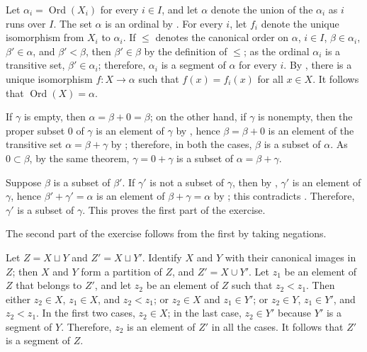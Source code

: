 \documentclass{article}
\begin{document}
\begin{solution}[\ref{exe:e0x1yv2c}]
  \label{sol:2a9apl7w}
  Let \(\alpha_i = \operatorname{Ord}(X_i)\) for every \(i \in I\),
  and let \(\alpha\) denote the union of the \(\alpha_i\) as \(i\)
  runs over \(I\).  The set \(\alpha\) is an ordinal by
  .  For every \(i\), let \(f_i\) denote the unique
  isomorphism from \(X_i\) to \(\alpha_i\).  If \(\leq\) denotes the
  canonical order on \(\alpha\), \(i \in I\), \(\beta \in \alpha_i\),
  \(\beta' \in \alpha\), and \(\beta' < \beta\), then
  \(\beta' \in \beta\) by the definition of \(\leq\); as the ordinal
  \(\alpha_i\) is a transitive set, \(\beta' \in \alpha_i\);
  therefore, \(\alpha_i\) is a segment of \(\alpha\) for every \(i\).
  By , there is a unique isomorphism
  \(f : X \to \alpha\) such that \(f(x) = f_i(x)\) for all
  \(x \in X\).  It follows that \(\operatorname{Ord}(X) = \alpha\).
\end{solution}

\begin{solution}[\ref{exe:v5ldoxkc}]
  \label{sol:2pzkfvo2}
  If \(\gamma\) is empty, then \(\alpha = \beta + 0 = \beta\); on the
  other hand, if \(\gamma\) is nonempty, then the proper subset \(0\)
  of \(\gamma\) is an element of \(\gamma\) by ,
  hence \(\beta = \beta + 0\) is an element of the transitive set
  \(\alpha = \beta + \gamma\) by ; therefore, in
  both the cases, \(\beta\) is a subset of \(\alpha\).  As
  \(0 \subset \beta\), by the same theorem, \(\gamma = 0 + \gamma\) is
  a subset of \(\alpha = \beta + \gamma\).
\end{solution}

\begin{solution}[\ref{exe:vwz0bksh}]
  \label{sol:27wcstr7}
  Suppose \(\beta\) is a subset of \(\beta'\).  If \(\gamma'\) is not
  a subset of \(\gamma\), then by ,
  \(\gamma'\) is an element of \(\gamma\), hence
  \(\beta' + \gamma' = \alpha\) is an element of
  \(\beta + \gamma = \alpha\) by ; this contradicts
  .  Therefore, \(\gamma'\) is a subset of
  \(\gamma\).  This proves the first part of the exercise.

  The second part of the exercise follows from the first by taking
  negations.
\end{solution}

\begin{solution}[\ref{exe:5b354opw}]
  \label{sol:suyilrlv}
  Let \(Z = X \sqcup Y\) and \(Z' = X \sqcup Y'\).  Identify \(X\) and
  \(Y\) with their canonical images in \(Z\); then \(X\) and \(Y\)
  form a partition of \(Z\), and \(Z' = X \cup Y'\).  Let \(z_1\) be
  an element of \(Z\) that belongs to \(Z'\), and let \(z_2\) be an
  element of \(Z\) such that \(z_2 < z_1\).  Then either
  \(z_2 \in X\), \(z_1 \in X\), and \(z_2 < z_1\); or \(z_2 \in X\)
  and \(z_1 \in Y'\); or \(z_2 \in Y\), \(z_1 \in Y'\), and
  \(z_2 < z_1\).  In the first two cases, \(z_2 \in X\); in the last
  case, \(z_2 \in Y'\) because \(Y'\) is a segment of \(Y\).
  Therefore, \(z_2\) is an element of \(Z'\) in all the cases.  It
  follows that \(Z'\) is a segment of \(Z\).
\end{solution}
\end{document}
